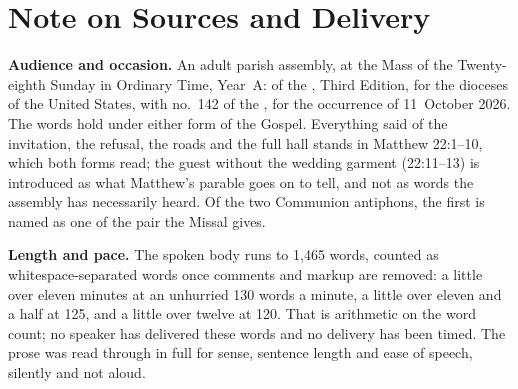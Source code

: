 
\section*{Note on Sources and Delivery}

{\small

\textbf{Audience and occasion.} An adult parish assembly, at the Mass of the
Twenty-eighth Sunday in Ordinary Time, Year~A:  of the , Third Edition, for the dioceses of the
United States, with no.~142 of the , for the
occurrence of 11~October 2026. The words hold under either form of the
Gospel. Everything said of the invitation, the refusal, the roads and the
full hall stands in Matthew 22:1--10, which both forms read; the guest without
the wedding garment (22:11--13) is introduced as what Matthew's parable goes
on to tell, and not as words the assembly has necessarily heard. Of the two
Communion antiphons, the first is named as one of the pair the Missal gives.

\textbf{Length and pace.} The spoken body runs to 1,465 words, counted as
whitespace-separated words once comments and markup are removed: a little over
eleven minutes at an unhurried 130 words a minute, a little over eleven and a
half at 125, and a little over twelve at 120. That is arithmetic on the word count; no
speaker has delivered these words and no delivery has been timed. The prose was read
through in full for sense, sentence length and ease of speech, silently and
not aloud.

}
